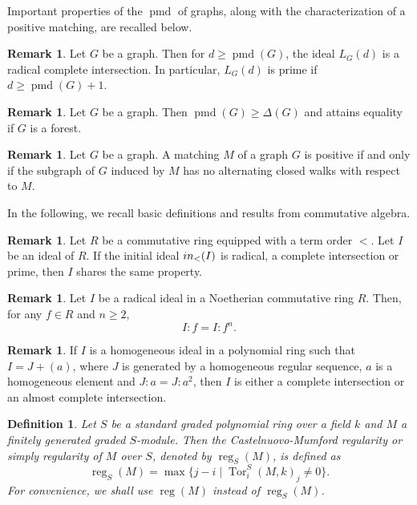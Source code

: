 \documentclass[11pt,a4paper,reqno]{amsart}
\newtheorem{definition}[thm]{Definition}
\theoremstyle{definition}
\newtheorem{remark}[thm]{Remark}
\numberwithin{equation}{section}
\DeclareMathOperator{\reg}{reg}
\DeclareMathOperator{\pmd}{pmd}
\DeclareMathOperator{\Tor}{Tor}
\begin{document}
Important properties of the $\pmd$ of graphs, along with the characterization of a positive matching, are recalled below.


\begin{remark} \cite[Theorem 1.3]{CW2019} \label{pmdCI}
    Let $G$ be a graph. Then
 for $d \geq \pmd(G)$, the ideal $L_G(d)$ is a radical complete intersection. In particular, $L_G(d)$ is prime if $d \geq \pmd(G) + 1$.
\end{remark}

\begin{remark} \cite[Lemma 5.4.(3)]{CW2019} \label{rem.pmdforest}
    Let $G$ be a graph. Then $\pmd(G) \geq \Delta(G)$ and attains equality if $G$ is a forest.
\end{remark}


\begin{remark} \cite[Theorem 2.1]{FG2022} \label{pos.match}
    Let $G$ be a graph. A matching $M$ of a graph $G$ is positive if and only if the subgraph of $G$ induced by $M$ has no alternating closed walks with respect to $M$.
\end{remark}

In the following, we recall basic definitions and results from commutative algebra.

\begin{remark} \cite[Lemma 2.2]{reg-seq} \label{rem.reg.seq}
    Let $R$ be a commutative ring equipped with a term order $<$. Let $I$ be an ideal of $R$. If the initial ideal $\textnormal{in}_{<}(I)$ is radical, a complete intersection or prime, then $I$ shares the same property.
\end{remark}  


\begin{remark}\cite[Lemma 4.1]{AK2021} \label{colonp} Let $I$ be a radical ideal in a Noetherian commutative ring $R$. Then, for any
$f \in R$ and $n \geq 2$, $$I : f = I : f^n.$$
\end{remark}

\begin{remark}\cite[Lemma 4.2]{AK2021} \label{CIorACI} If $I$ is a homogeneous ideal in a polynomial ring such that $I = J + (a)$, where $J$ is generated by a homogeneous regular sequence, $a$ is a homogeneous element and
$J: a = J: a^2$, then $I$ is either a complete intersection or an almost complete intersection.
\end{remark}

\begin{definition}
    Let $S$ be a standard graded polynomial ring over a field $k$ and 
    $M$ a finitely generated graded $S$-module. 
    Then the \emph{Castelnuovo-Mumford regularity} or simply  \emph{regularity} of $M$ over $S$, denoted by $\reg_S (M)$, is defined as
    $$\reg_S(M) = \max \{j-i \mid \Tor_i^S(M,k)_{j} \neq 0\}.$$
    For convenience, we shall use $\reg(M)$ instead of $\reg_S(M)$.
\end{definition}
\end{document}

